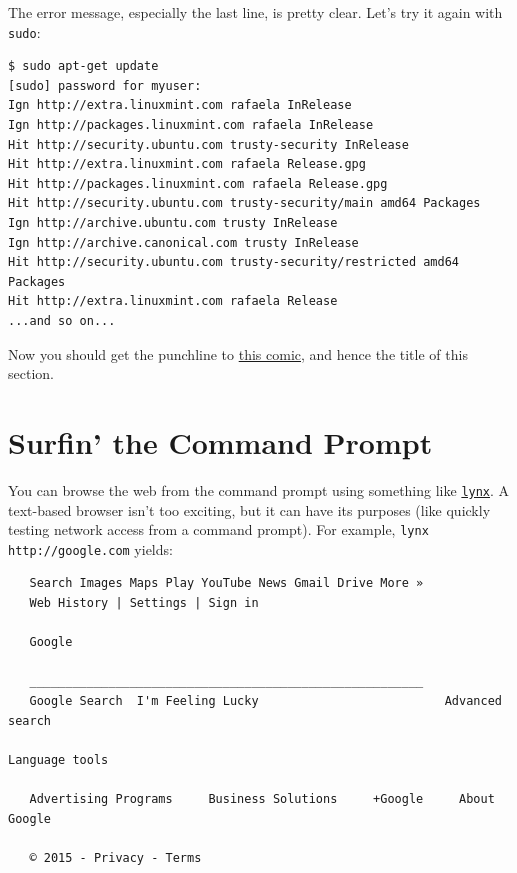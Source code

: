 \documentclass[10pt,]{book}
\numberwithin{figure}{chapter}
\begin{document}
The error message, especially the last line, is pretty clear. Let's try
it again with \texttt{sudo}:

\begin{verbatim}
$ sudo apt-get update
[sudo] password for myuser: 
Ign http://extra.linuxmint.com rafaela InRelease
Ign http://packages.linuxmint.com rafaela InRelease                            
Hit http://security.ubuntu.com trusty-security InRelease                       
Hit http://extra.linuxmint.com rafaela Release.gpg                             
Hit http://packages.linuxmint.com rafaela Release.gpg                          
Hit http://security.ubuntu.com trusty-security/main amd64 Packages             
Ign http://archive.ubuntu.com trusty InRelease                                 
Ign http://archive.canonical.com trusty InRelease                              
Hit http://security.ubuntu.com trusty-security/restricted amd64 Packages       
Hit http://extra.linuxmint.com rafaela Release                
...and so on...
\end{verbatim}

Now you should get the punchline to \href{https://xkcd.com/149/}{this
comic}, and hence the title of this section.

\section{Surfin' the Command Prompt}\label{surfin-the-command-prompt}

You can browse the web from the command prompt using something like
\href{http://linux.die.net/man/1/lynx}{\texttt{lynx}}. A text-based
browser isn't too exciting, but it can have its purposes (like quickly
testing network access from a command prompt). For example,
\texttt{lynx http://google.com} yields:

\begin{verbatim}
   Search Images Maps Play YouTube News Gmail Drive More »
   Web History | Settings | Sign in

   Google

   _______________________________________________________
   Google Search  I'm Feeling Lucky                          Advanced search
                                                                                                             Language tools

   Advertising Programs     Business Solutions     +Google     About Google

   © 2015 - Privacy - Terms
\end{verbatim}
\end{document}
